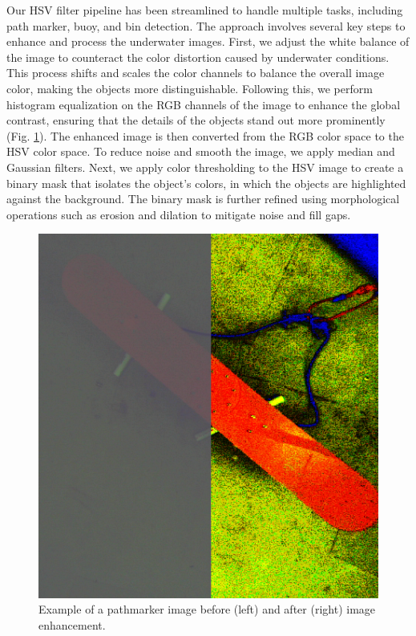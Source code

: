 \documentclass[conference]{IEEEtran}
\begin{document}
Our HSV filter pipeline has been streamlined to handle multiple tasks, including path marker, buoy, and bin detection. The approach involves several key steps to enhance and process the underwater images. First, we adjust the white balance of the image to counteract the color distortion caused by underwater conditions. This process shifts and scales the color channels to balance the overall image color, making the objects more distinguishable. Following this, we perform histogram equalization on the RGB channels of the image to enhance the global contrast, ensuring that the details of the objects stand out more prominently (Fig. \ref{fig:enhanced_compare}). The enhanced image is then converted from the RGB color space to the HSV color space. To reduce noise and smooth the image, we apply median and Gaussian filters. Next, we apply color thresholding to the HSV image to create a binary mask that isolates the object’s colors, in which the objects are highlighted against the background. The binary mask is further refined using morphological operations such as erosion and dilation to mitigate noise and fill gaps.


\begin{figure}[htbp]
    \centerline{\includegraphics[scale=0.32]{images/pathmarker_compare.png}}
    \caption{Example of a pathmarker image before (left) and after (right) image enhancement.}
    \label{fig:enhanced_compare}
\end{figure}
\end{document}
